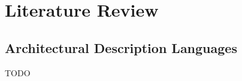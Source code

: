 \chapter{Literature Review}

\section{Architectural Description Languages}
\label{sec:adl-lit-review}

TODO